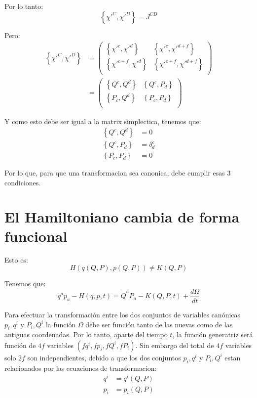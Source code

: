 \documentclass[paper=a4, fontsize=11pt,twoside]{scrartcl}
\begin{document}
Por lo tanto:
	\begin{equation*}
		\left\{ \chi'^{C}, \chi'^{D}  \right\}	 = J^{CD}
	\end{equation*}

Pero:
	\begin{align*}
	 \left\{ \chi'^{C}, \chi'^{D}  \right\}	 &=
\begin{pmatrix}  \left\{ \chi'^{c}, \chi'^{d}  \right\} & \left\{ \chi'^{c}, \chi'^{d+f}  \right\} \\
				 \left\{ \chi'^{c+f}, \chi'^{d}  \right\} & \left\{ \chi'^{c+f}, \chi'^{d+f}  \right\} \\
\end{pmatrix} \\  &=
\begin{pmatrix}  \left\{ Q^{c}, Q^{d}  \right\} & \left\{ Q^{c}, P_{d}  \right\} \\
				 \left\{ P_{c}, Q^{d}  \right\} & \left\{ P_{c}, P_{d}  \right\} \\
\end{pmatrix}
	\end{align*}

Y como esto debe ser igual a la matrix simplectica, tenemos que:
	\begin{align*}
		\left\{ Q^{c}, Q^{d}  \right\} &= 0 \\
		\left\{ Q^{c}, P_{d}  \right\} &= \delta^{c}_{d} \\
		\left\{ P_{c}, P_{d}  \right\} &= 0
	\end{align*}

Por lo que, para que una transformacion sea canonica, debe cumplir esas 3 condiciones.

\section{El Hamiltoniano cambia de forma funcional}

Esto es:
	\begin{equation*}
		H\left(q(Q,P),p(Q,P) \right) \neq K(Q,P)
	\end{equation*}

Tenemos que:
	\begin{equation*}
		\dot{q}^{a}p_{a} - H(q,p,t) =  \dot{Q}^{a}P_{a} - K(Q,P,t)  + \frac{d\Omega}{dt}
	\end{equation*}

Para efectuar la transformaci\'on entre los dos conjuntos de variables can\'onicas ${p_{i},q^{i}}$ y ${P_{i},Q^{i}}$ la
funci\'on $\Omega$ debe ser funci\'on tanto de las nuevas como de las antiguas coordenadas. Por lo tanto, aparte del
tiempo $t$, la funci\'on generatriz ser\'a funci\'on de $4f$ variables $(fq^{i},fp_{i},fQ^{i},fP_{i})$. Sin embargo del total de $4f$
variables solo $2f$ son independientes, debido a que los dos conjuntos ${p_{i},q^{i}}$ y ${P_{i},Q^{i}}$ estan relacionados
por las ecuaciones de transformacion:
	\begin{align*}
		q^{i} &= q^{i}(Q,P) \\
		p_{i} &= p_{i}(Q,P) \\
	\end{align*}
	
\end{document}
